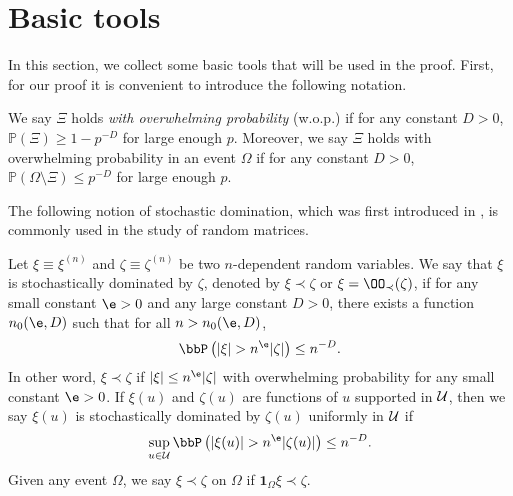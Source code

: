 \documentclass[aos,preprint]{imsart}
\begin{document}
\section{Basic tools}\label{app_tool}
In this section, we collect some basic tools that will be used in the proof.
First, for our proof it is convenient to introduce the following notation.
\begin{definition}
 We say $\Xi$ holds \emph{with overwhelming probability} (w.o.p.) if for any constant $D>0$, $\mathbb P(\Xi)\ge 1- p^{-D}$ for large enough $p$. Moreover, we say $\Xi$ holds with overwhelming probability in an event $\Omega$ if for any constant $D>0$, $\mathbb P(\Omega\setminus \Xi)\le p^{-D}$ for large enough $p$.
\end{definition}

The following notion of stochastic domination, which was first introduced in \cite{Average_fluc}, is commonly used in the study of random matrices.

\begin{definition}\label{stoch_domination}
Let $\xi\equiv \xi^{(n)}$ and $\zeta\equiv \zeta^{(n)}$ be two $n$-dependent random variables.
We say that $\xi$ is stochastically dominated by $\zeta$, denoted by $\xi\prec \zeta$ or $\xi=\OO_\prec(\zeta)$, if for any small constant $\e > 0$ and any large constant $D > 0$, there exists a function $n_0(\e, D)$ such that for all $n > n_0(\e, D)$,
\[ \bbP\left(|\xi| >n^\e |\zeta|\right)\le n^{-D}. \]
In other word, $\xi\prec \zeta$ if $|\xi| \le n^\e |\zeta|$ with overwhelming probability for any small constant $\e>0$. If $\xi(u)$ and $\zeta(u)$ are functions of $u$ supported in $\cal U$, then we say $\xi(u)$ is stochastically dominated by $\zeta(u)$ uniformly in $\cal U$ if %
\[ \sup_{u\in \cal U}\bbP\left(|\xi(u)|>n^\e |\zeta(u)|\right)\le n^{-D}. \]
Given any event $\Omega$, we say $\xi \prec \zeta$ on $\Omega$ if $\mathbf 1_{\Omega}\xi \prec \zeta$.
\end{definition}
\end{document}
